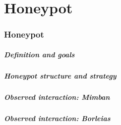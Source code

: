 \part{Honeypot}
\section{Honeypot}

\begin{frame}
	\partpage
\end{frame}

\begin{frame}
	\frametitle{Definition and goals}
\end{frame}

\begin{frame}
	\frametitle{Honeypot structure and strategy}
\end{frame}

\begin{frame}
	\frametitle{Observed interaction: Mimban}
\end{frame}

\begin{frame}
	\frametitle{Observed interaction: Borleias}
\end{frame}

